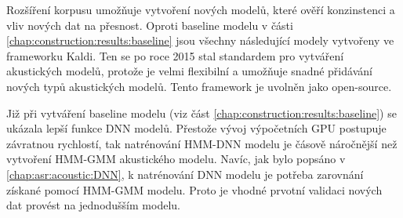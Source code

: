 

Rozšíření korpusu umožňuje vytvoření nových modelů, které ověří konzinstenci a vliv nových dat na přesnost. Oproti baseline modelu v části \ref{chap:construction:results:baseline} jsou všechny následující modely vytvořeny ve frameworku Kaldi. Ten se po roce 2015 stal standardem pro vytváření akustických modelů, protože je velmi flexibilní a umožňuje snadné přidávání nových typů akustických modelů. \cite{Kaldi2011} Tento framework je uvolněn jako open-source.



Již při vytváření baseline modelu (viz část \ref{chap:construction:results:baseline}) se ukázala lepší funkce DNN modelů. Přestože vývoj výpočetních GPU postupuje závratnou rychlostí, tak natrénování HMM-DNN modelu je čásově náročnější než vytvoření HMM-GMM akustického modelu. Navíc, jak bylo popsáno v \ref{chap:asr:acoustic:DNN}, k natrénování DNN modelu je potřeba zarovnání získané pomocí HMM-GMM modelu. Proto je vhodné prvotní validaci nových dat provést na jednodušším modelu.



